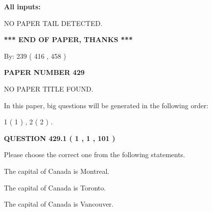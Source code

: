 \documentclass[12pt]{article}
\begin{document}
   
   
   
\noindent{}
   
   
   
   
\noindent\vspace{0.1in}\hspace{-0.08in} {\textbf{\Large{All inputs: }}}
   
   
   
   
\vspace{2.0in} NO PAPER TAIL DETECTED.
   
   
   
   
\vspace{1.0in} 
{\textbf{\large{ *** END OF PAPER, THANKS *** }}} 
   
   
\hspace{1.0in} By: 
 239 ( 416 ,  458 )
   
   
   
   
\newpage 
\setcounter{page}{ 
   429001 } 
   
   
   
   
 {\textbf{ \Large{ PAPER NUMBER  429  }}}
   
   
\vspace{0.2in}
   
   
   
   
   
   
 NO PAPER TITLE FOUND.
   
   
   
\vspace{0.2in}
   
In this paper, big questions will be generated in the following order: 
   
   
   1 ( 1 )
 ,
   2 ( 2 )
 .
  
\vspace{0.2in}
  
{\textbf{\Large{QUESTION
429.1 
 ( 1 , 1 , 101 )
}}}
  
  
Please choose the correct one from the following statements.
 
 
The capital of Canada is Montreal.
 
 
The capital of Canada is Toronto.
 
 
The capital of Canada is Vancouver.
 
\end{document}
